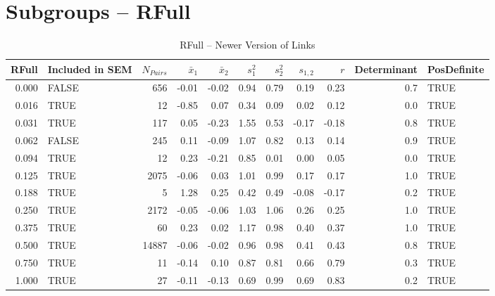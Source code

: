 \documentclass{article}\usepackage[]{graphicx}\usepackage[]{color}
\begin{document}
\section{Subgroups --  RFull }%
\begin{table}[ht]
\centering
\begin{tabular}{rlrrrrrrrrl}
  \hline
RFull & Included in SEM & $N_{Pairs}$ & $\bar{x}_1$ & $\bar{x}_2$ & $s_1^2$ & $s_2^2$ & $s_{1,2}$ & $r$ & Determinant & PosDefinite \\ 
  \hline
0.000 & FALSE & 656 & -0.01 & -0.02 & 0.94 & 0.79 & 0.19 & 0.23 & 0.7 & TRUE \\ 
  0.016 & TRUE & 12 & -0.85 & 0.07 & 0.34 & 0.09 & 0.02 & 0.12 & 0.0 & TRUE \\ 
  0.031 & TRUE & 117 & 0.05 & -0.23 & 1.55 & 0.53 & -0.17 & -0.18 & 0.8 & TRUE \\ 
  0.062 & FALSE & 245 & 0.11 & -0.09 & 1.07 & 0.82 & 0.13 & 0.14 & 0.9 & TRUE \\ 
  0.094 & TRUE & 12 & 0.23 & -0.21 & 0.85 & 0.01 & 0.00 & 0.05 & 0.0 & TRUE \\ 
  0.125 & TRUE & 2075 & -0.06 & 0.03 & 1.01 & 0.99 & 0.17 & 0.17 & 1.0 & TRUE \\ 
  0.188 & TRUE & 5 & 1.28 & 0.25 & 0.42 & 0.49 & -0.08 & -0.17 & 0.2 & TRUE \\ 
  0.250 & TRUE & 2172 & -0.05 & -0.06 & 1.03 & 1.06 & 0.26 & 0.25 & 1.0 & TRUE \\ 
  0.375 & TRUE & 60 & 0.23 & 0.02 & 1.17 & 0.98 & 0.40 & 0.37 & 1.0 & TRUE \\ 
  0.500 & TRUE & 14887 & -0.06 & -0.02 & 0.96 & 0.98 & 0.41 & 0.43 & 0.8 & TRUE \\ 
  0.750 & TRUE & 11 & -0.14 & 0.10 & 0.87 & 0.81 & 0.66 & 0.79 & 0.3 & TRUE \\ 
  1.000 & TRUE & 27 & -0.11 & -0.13 & 0.69 & 0.99 & 0.69 & 0.83 & 0.2 & TRUE \\ 
   \hline
\end{tabular}
\caption{RFull -- Newer Version of Links} 
\end{table}
\end{document}
